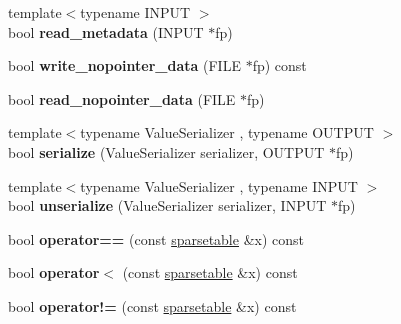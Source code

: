 \begin{DoxyCompactItemize}
\item 
{\footnotesize template$<$typename I\+N\+P\+UT $>$ }\\bool {\bfseries read\+\_\+metadata} (I\+N\+P\+UT $\ast$fp)\hypertarget{classspp___1_1sparsetable_a80a51addfabee86c0dd1bcb1c1501bac}{}\label{classspp___1_1sparsetable_a80a51addfabee86c0dd1bcb1c1501bac}

\item 
bool {\bfseries write\+\_\+nopointer\+\_\+data} (F\+I\+LE $\ast$fp) const \hypertarget{classspp___1_1sparsetable_add3aa64353e1543303aedb7d5241b2b4}{}\label{classspp___1_1sparsetable_add3aa64353e1543303aedb7d5241b2b4}

\item 
bool {\bfseries read\+\_\+nopointer\+\_\+data} (F\+I\+LE $\ast$fp)\hypertarget{classspp___1_1sparsetable_a9bad56982b41d7814279afdcbc1e1f31}{}\label{classspp___1_1sparsetable_a9bad56982b41d7814279afdcbc1e1f31}

\item 
{\footnotesize template$<$typename Value\+Serializer , typename O\+U\+T\+P\+UT $>$ }\\bool {\bfseries serialize} (Value\+Serializer serializer, O\+U\+T\+P\+UT $\ast$fp)\hypertarget{classspp___1_1sparsetable_a522d0218446648d7908590bb4b5629f4}{}\label{classspp___1_1sparsetable_a522d0218446648d7908590bb4b5629f4}

\item 
{\footnotesize template$<$typename Value\+Serializer , typename I\+N\+P\+UT $>$ }\\bool {\bfseries unserialize} (Value\+Serializer serializer, I\+N\+P\+UT $\ast$fp)\hypertarget{classspp___1_1sparsetable_a12bb46b90f91f267a95f835a9a156ef1}{}\label{classspp___1_1sparsetable_a12bb46b90f91f267a95f835a9a156ef1}

\item 
bool {\bfseries operator==} (const \hyperlink{classspp___1_1sparsetable}{sparsetable} \&x) const \hypertarget{classspp___1_1sparsetable_a8189751c8a9e3dcbaa133d080751847a}{}\label{classspp___1_1sparsetable_a8189751c8a9e3dcbaa133d080751847a}

\item 
bool {\bfseries operator$<$} (const \hyperlink{classspp___1_1sparsetable}{sparsetable} \&x) const \hypertarget{classspp___1_1sparsetable_aa448492a02d3fd5b638e19b70ac50242}{}\label{classspp___1_1sparsetable_aa448492a02d3fd5b638e19b70ac50242}

\item 
bool {\bfseries operator!=} (const \hyperlink{classspp___1_1sparsetable}{sparsetable} \&x) const \hypertarget{classspp___1_1sparsetable_aef9329021d01fb731c0c915908aad940}{}\label{classspp___1_1sparsetable_aef9329021d01fb731c0c915908aad940}


\end{DoxyCompactItemize}
